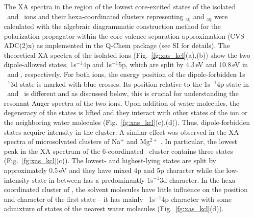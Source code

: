{\color{blue} The XA spectra in the region of the lowest core-excited states of the isolated \ki~and \cli~ions and their hexa-coordinated clusters representing \ki$_{\text{aq}}$ and \cli$_{\text{aq}}$ were calculated with the algebraic diagrammatic construction method for the polarization propagator \citep{sch82:2395} within the core-valence separation approximation \citep{bar85:867,ced80:206,ced81:1038} (CVS-ADC(2)x) as implemented in the Q-Chem package \citep{Wenzel14:1900,Wenzel14:4583,Wormit14:774,QChem2015} (see SI for details).}
The theoretical XA spectra of the isolated ions (Fig.\ \ref{fg:xas_kcl}(a),(b)) show the two dipole-allowed states, 1s$^{-1}$4p and 1s$^{-1}$5p, which are split by 4.3\,eV and 10.8\,eV in \ki~and \cli, respectively. For both ions, the energy position of the dipole-forbidden 1s$^{-1}$3d {\color{blue} state is} marked with blue crosses. {\color{blue} Its position relative to the 1s$^{-1}$4p state in \ki~and \cli~is different and as discussed below, this is crucial} for understanding the resonant Auger spectra of the two ions. Upon addition of water molecules, the degeneracy of the states is lifted and they interact with other states of the ion or the neighboring water molecules (Fig.\ \ref{fg:xas_kcl}(c),(d)). Thus, dipole-forbidden states acquire intensity in the cluster. A similar effect was observed in the XA spectra of microsolvated clusters of Na$^{+}$ and Mg$^{2+}$ \citep{miteva16:16671}.
%
%
{\color{blue} In particular, the lowest peak in the XA spectrum of the} 6-coordinated \ki~cluster contains three states (Fig.\ \ref{fg:xas_kcl}(c)). The lowest- and highest-lying states are split by approximately 0.5\,eV and they have mixed 4p and 5p character while the low-intensity state in between has a predominantly 1s$^{-1}$3d character. In the hexa-coordinated cluster of \cli, the solvent molecules have little influence on the position and character of the first state -- it has mainly \cli~1s$^{-1}$4p character with some admixture of states of the nearest water molecules (Fig.\ \ref{fg:xas_kcl}(d)).


